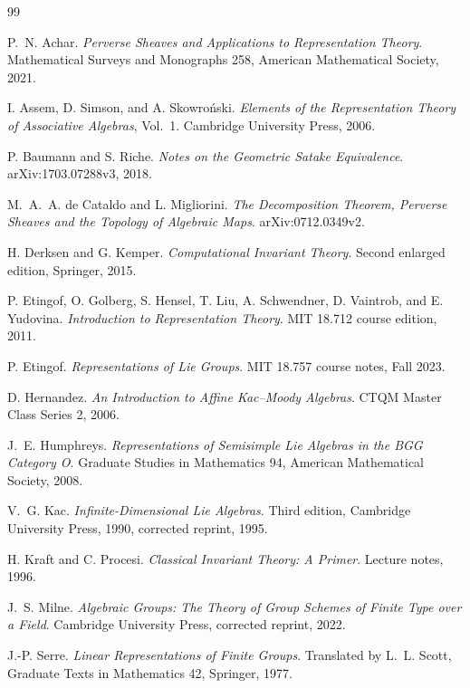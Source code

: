 \documentclass[11pt,oneside,openany]{book}
\newcommand{\runningchapter}{}
\theoremstyle{definition}
\theoremstyle{remark}
\begin{document}
\begin{thebibliography}{99}
{}
\renewcommand{\runningchapter}{Bibliography}
\setlength{\itemsep}{2pt}

P.~N. Achar.
\emph{Perverse Sheaves and Applications to Representation Theory}.
Mathematical Surveys and Monographs 258, American Mathematical Society, 2021.

I. Assem, D. Simson, and A. Skowro\'nski.
\emph{Elements of the Representation Theory of Associative Algebras}, Vol.~1.
Cambridge University Press, 2006.

P. Baumann and S. Riche.
\emph{Notes on the Geometric Satake Equivalence}.
arXiv:1703.07288v3, 2018.

M.~A.~A. de Cataldo and L. Migliorini.
\emph{The Decomposition Theorem, Perverse Sheaves and the Topology of Algebraic Maps}.
arXiv:0712.0349v2.

H. Derksen and G. Kemper.
\emph{Computational Invariant Theory}.
Second enlarged edition, Springer, 2015.

P. Etingof, O. Golberg, S. Hensel, T. Liu, A. Schwendner,
D. Vaintrob, and E. Yudovina.
\emph{Introduction to Representation Theory}.
MIT 18.712 course edition, 2011.

P. Etingof.
\emph{Representations of Lie Groups}.
MIT 18.757 course notes, Fall 2023.

D. Hernandez.
\emph{An Introduction to Affine Kac--Moody Algebras}.
CTQM Master Class Series 2, 2006.

J.~E. Humphreys.
\emph{Representations of Semisimple Lie Algebras in the BGG Category O}.
Graduate Studies in Mathematics 94, American Mathematical Society, 2008.

V.~G. Kac.
\emph{Infinite-Dimensional Lie Algebras}.
Third edition, Cambridge University Press, 1990, corrected reprint, 1995.

H. Kraft and C. Procesi.
\emph{Classical Invariant Theory: A Primer}.
Lecture notes, 1996.

J.~S. Milne.
\emph{Algebraic Groups: The Theory of Group Schemes of Finite Type over a Field}.
Cambridge University Press, corrected reprint, 2022.

J.-P. Serre.
\emph{Linear Representations of Finite Groups}.
Translated by L.~L. Scott, Graduate Texts in Mathematics 42, Springer, 1977.


\end{thebibliography}
\end{document}
